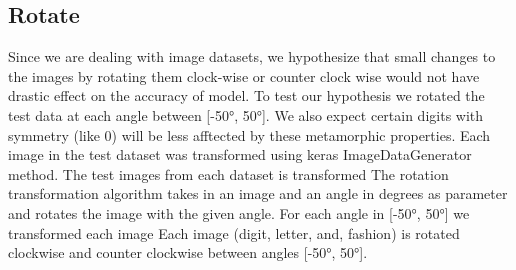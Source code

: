 \subsection{Rotate}
Since we are dealing with image datasets, we hypothesize that small changes to the images by rotating them clock-wise or counter clock wise would not have drastic effect on the accuracy of model. To test our hypothesis we rotated the test data at each angle between [\ang{-50}, \ang{50}]. We also expect certain digits with symmetry (like 0) will be less afftected by these metamorphic properties.
 Each image in the test dataset was transformed using keras ImageDataGenerator method. 
The test images from each dataset is transformed The rotation transformation algorithm takes in an image and an angle in degrees as parameter and rotates the image with the given angle. For each angle in [\ang{-50}, \ang{50}] we transformed each image Each image (digit, letter, and, fashion) is rotated clockwise and counter clockwise between angles [\ang{-50}, \ang{50}]. 
